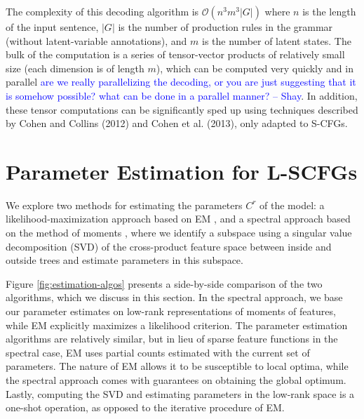 \documentclass[11pt]{article}
\newcommand{\shaycomment}[1]{\textcolor{blue}{#1 -- Shay}}
\begin{document}
The complexity of this decoding algorithm is $\mathcal{O}(n^3 m^3 |G|)$ where $n$ is the length of the input sentence, $|G|$ is the number of production rules in the grammar (without latent-variable annotations), and $m$ is the number of latent states.
The bulk of the computation is a series of tensor-vector products of relatively small size (each dimension is of length $m$), which can be computed very quickly and in parallel \shaycomment{are we really parallelizing the decoding, or you are just suggesting that it is somehow possible? what can be done in a parallel manner?}. In addition, these tensor computations can be significantly
sped up using techniques described by Cohen and Collins (2012) and Cohen et al. (2013)\nocite{cohen-12c,cohen-13a}, only adapted to S-CFGs.  

\section{Parameter Estimation for L-SCFGs}
\label{sec:estimation}
We explore two methods for estimating the parameters $C^r$ of the model: a likelihood-maximization approach based on EM \cite{Dempster1977}, and a spectral approach based on the method of moments \cite{Hsu2009}, where we identify a subspace using a singular value decomposition (SVD) \cite{Golub1996} of the cross-product feature space between inside and outside trees and estimate parameters in this subspace. 

Figure \ref{fig:estimation-algos} presents a side-by-side comparison of the two algorithms, which we discuss in this section.  
In the spectral approach, we base our parameter estimates on low-rank representations of moments of features, while EM explicitly maximizes a likelihood criterion. 
The parameter estimation algorithms are relatively similar, but in lieu of sparse feature functions in the spectral case, EM uses partial counts estimated with the current set of parameters.  
The nature of EM allows it to be susceptible to local optima, while the spectral approach comes with guarantees on obtaining the global optimum. 
Lastly, computing the SVD and estimating parameters in the low-rank space is a one-shot operation, as opposed to the iterative procedure of EM. 
\end{document}
